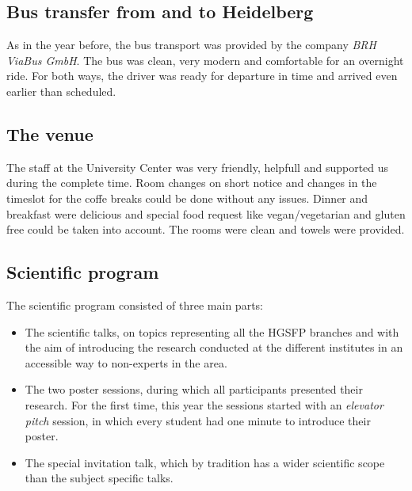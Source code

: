 \documentclass[11pt,a4paper]{article}
\numberwithin{equation}{section}
\numberwithin{table}{section}\setlength{\multlinegap}{25pt}
\begin{document}
\subsection*{Bus transfer from and to Heidelberg}
As in the year before, the bus transport was provided by the company \textit{BRH ViaBus GmbH}. The bus was clean, very modern and comfortable for an overnight ride. For both ways, the driver was ready for departure in time and arrived even earlier than scheduled.

\subsection*{The venue}

The staff at the University Center was very friendly, helpfull and supported
us during the complete time. Room changes on short notice and changes in the
timeslot for the coffe breaks could be done without any issues. 
Dinner and breakfast were delicious and special food request like
vegan/vegetarian and gluten free could be taken into account.\newline
The rooms were clean and towels were provided. 
\subsection*{Scientific program}

\noindent The scientific program consisted of three main parts:
\begin{itemize}
\item The scientific talks, on topics representing all the HGSFP branches and with the aim of introducing the research conducted at the different institutes in an accessible way to non-experts in the area.
\item The two poster sessions, during which all participants presented their research. For the first time, this year the sessions started with an \textit{elevator pitch} session, in which every student had one minute to introduce their poster.
\item The special invitation talk, which by tradition has a wider scientific scope than the subject specific talks.
\end{itemize}
\end{document}
